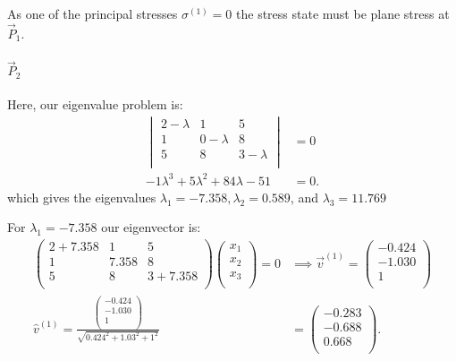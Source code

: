 \begin{derivation}
   As one of the principal stresses $\sigma^{(1)} = 0$ the stress state must be plane stress at $\Vec{P}_1$.
   
    
  \paragraph{$\Vec{P}_2$}
  Here, our eigenvalue problem is:
  \begin{align*}
    \begin{vmatrix}
      2-\lambda & 1 & 5\\
    1 & 0 - \lambda & 8\\
    5 & 8 & 3 - \lambda\\
  \end{vmatrix} &= 0 \\
  -1 \lambda ^3+5 \lambda ^2+84 \lambda -51 &= 0
  .\end{align*}
  which gives the eigenvalues $\lambda_1 = \num{-7,358}, \lambda_2 = \num{0,589}$, and $\lambda_3 = \num{11,769}$
  
  For $\lambda_1 = \num{-7,358}$ our eigenvector is:
  \begin{align*}
    \begin{pmatrix}
      2 + \num{7,358}  & 1 & 5\\
    1 & \num{7,358}  & 8\\
    5 & 8 & 3 + \num{7,358} \\
    \end{pmatrix} \begin{pmatrix}
      x_1\\
    x_2\\
    x_3\\
    \end{pmatrix} = 0 &\implies \Vec{v}^{(1)} = \begin{pmatrix}
      \num{-0,424} \\
    \num{-1,030} \\
    1\\
    \end{pmatrix} \\
    \hat{v}^{(1)} = \frac{\begin{pmatrix}
     - \num{0.424} \\
    -\num{1.030} \\
    1\\
\end{pmatrix}}{\sqrt{\num{0,424} ^2 + \num{1,03} ^2 + 1^2}}  &= \left(
\begin{array}{c}
  \num{-0.283} \\
\num{ -0.688} \\
\num{ 0.668} \\
\end{array}
\right)
  .\end{align*}
  

\end{derivation}
